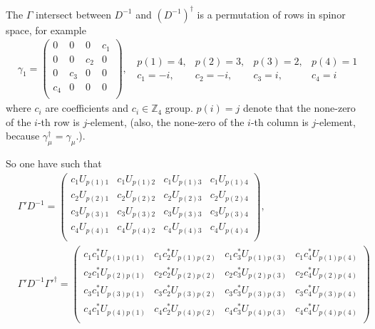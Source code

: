The $\Gamma$ intersect between $D^{-1}$ and $\left(D^{-1}\right)^{\dagger}$ is a permutation of rows in spinor space, for example
\begin{equation}
\begin{split}
&\gamma _1=\left(\begin{array}{cccc}
0 & 0 & 0 & c_1 \\
0 & 0 & c_2 & 0 \\
0 & c_3 & 0 & 0 \\
c_4 & 0 & 0 & 0 \\
\end{array}\right),\;\;\begin{array}{cccc} p(1)=4,&p(2)=3,&p(3)=2,&p(4)=1 \\ c_1=-i, & c_2=-i, &c_3=i, &c_4=i \end{array}
\end{split}
\end{equation}
where $c_i$ are coefficients and $c_i\in \mathbb{Z}_4$ group. $p(i)=j$ denote that the none-zero of the $i$-th row is $j$-element, (also, the none-zero of the $i$-th column is $j$-element, because $\gamma _{\mu}^{\dagger}=\gamma _{\mu}$.).

So one have such that
\begin{equation}
\begin{split}
&\Gamma ' D^{-1}=\left(\begin{array}{cccc}
c_1U_{p(1)1} & c_1U_{p(1)2} & c_1U_{p(1)3} & c_1U_{p(1)4} \\
c_2U_{p(2)1} & c_2U_{p(2)2} & c_2U_{p(2)3} & c_2U_{p(2)4} \\
c_3U_{p(3)1} & c_3U_{p(3)2} & c_3U_{p(3)3} & c_3U_{p(3)4} \\
c_4U_{p(4)1} & c_4U_{p(4)2} & c_4U_{p(4)3} & c_4U_{p(4)4} \\
\end{array}\right),\\
&\Gamma ' D^{-1} {\Gamma'}^{\dagger}=\left(\begin{array}{cccc}
c_1c^*_1U_{p(1)p(1)} & c_1c^*_2U_{p(1)p(2)} & c_1c^*_3U_{p(1)p(3)} & c_1c^*_4U_{p(1)p(4)} \\
c_2c^*_1U_{p(2)p(1)} & c_2c^*_2U_{p(2)p(2)} & c_2c^*_3U_{p(2)p(3)} & c_2c^*_4U_{p(2)p(4)} \\
c_3c^*_1U_{p(3)p(1)} & c_3c^*_2U_{p(3)p(2)} & c_3c^*_3U_{p(3)p(3)} & c_3c^*_4U_{p(3)p(4)} \\
c_4c^*_1U_{p(4)p(1)} & c_4c^*_2U_{p(4)p(2)} & c_4c^*_3U_{p(4)p(3)} & c_4c^*_4U_{p(4)p(4)} \\
\end{array}\right)\\
\end{split}
\end{equation}

